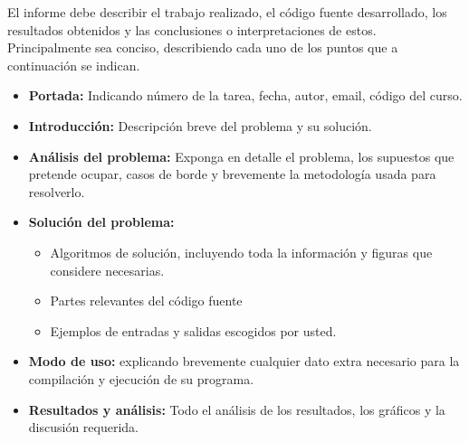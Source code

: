\documentclass[dcc]{fcfmcourse}
\begin{document}
El informe debe describir el trabajo realizado, el código fuente desarrollado, los resultados obtenidos y las conclusiones o interpretaciones de estos. Principalmente sea conciso, describiendo cada uno de los puntos que a continuación se indican.

\begin{itemize}
    \item \textbf{Portada:} Indicando número de la tarea, fecha, autor, email, código del curso.
    \item \textbf{Introducción:} Descripción breve del problema y su solución.
    \item \textbf{Análisis del problema:} Exponga en detalle el problema, los supuestos que pretende ocupar, casos de borde y brevemente la metodología usada para resolverlo.
    \item \textbf{Solución del problema:}
    \begin{itemize}
        \item Algoritmos de solución, incluyendo toda la información y figuras que considere necesarias.
        \item Partes relevantes del código fuente
        \item Ejemplos de entradas y salidas escogidos por usted.
    \end{itemize}
    \item \textbf{Modo de uso:} explicando brevemente cualquier dato extra necesario para la compilación y ejecución de su programa.
    \item \textbf{Resultados y análisis:} Todo el análisis de los resultados, los gráficos y la discusión requerida.
\end{itemize}
\end{document}
